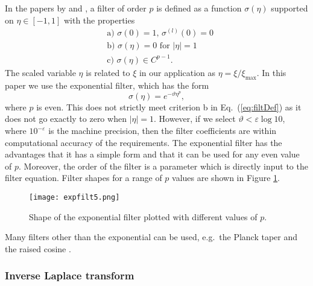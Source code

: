\documentclass[11pt,a4paper]{article}
\begin{document}
In the papers by \cite{gottlieb1997gibbs} and \cite{vandeven1991family}, a filter of order $p$ is defined as a function $\sigma(\eta)$ supported on $\eta\in[-1,1]$ with the properties
\begin{align}
\label{eq:filtDef}
& \text{a) }\sigma(0)=1\text{,    } \sigma^{(l)}(0)=0 \nonumber\\
& \text{b) }\sigma(\eta)=0 \text{ for }|\eta|=1\\
& \text{c) }\sigma(\eta)\in C^{p-1}.\nonumber
\end{align}
The scaled variable $\eta$ is related to $\xi$ in our application as $\eta=\xi/\xi_{\max}$. In this paper we use the exponential filter, which has the form \citep{gottlieb1997gibbs}
\begin{equation}
\label{eq:expFilt}
\sigma(\eta)=e^{-\vartheta\eta^p},
\end{equation}
where $p$ is even. This does not strictly meet criterion b in Eq.~(\ref{eq:filtDef}) as it does not go exactly to zero when $|\eta|=1$. However, if we select $\vartheta<\varepsilon\log 10$, where $10^{-\varepsilon}$ is the machine precision, then the filter coefficients are within computational accuracy of the requirements. The exponential filter has the advantages that it has a simple form and that it can be used for any even value of $p$. Moreover, the order of the filter is a parameter which is directly input to the filter equation. Filter shapes for a range of $p$ values are shown in Figure \ref{fig:expfilt2}.
\begin{figure}
\begin{center}
\texttt{[image: expfilt5.png]}
\caption{Shape of the exponential filter plotted with different values of $p$.}
\label{fig:expfilt2}
\end{center}
\end{figure}
Many filters other than the exponential can be used, e.g.\ the Planck taper \citep{Phelan2017} and the raised cosine \citep{ruijter2015application}.

\subsubsection{Inverse Laplace transform}
\end{document}
